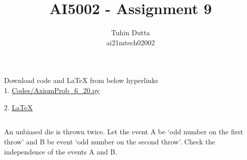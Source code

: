 \documentclass[journal,12pt,twocolumn]{IEEEtran}
\begin{document}
\providecommand{\mtx}[1]{\mathbf{#1}}
\providecommand{\fourier}{\overset{\mathcal{F}}{ \rightleftharpoons}}
\providecommand{\system}{\overset{\mathcal{H}}{ \longleftrightarrow}}
\newcommand{\solution}{\noindent \textbf{Solution: }}
\newcommand{\cosec}{\,\text{cosec}\,}
\providecommand{\dec}[2]{\ensuremath{\overset{#1}{\underset{#2}{\gtrless}}}}
\newcommand{\myvec}[1]{\ensuremath{\begin{pmatrix}#1\end{pmatrix}}}
\newcommand{\mydet}[1]{\ensuremath{\begin{vmatrix}#1\end{vmatrix}}}
\makeatletter
{}
\makeatother
\let\StandardTheFigure\thefigure
\let\vec\mathbf
\renewcommand{\thefigure}{\theproblem}
\def\putbox#1#2#3{\makebox[0in][l]{\makebox[#1][l]{}\raisebox{\baselineskip}[0in][0in]{\raisebox{#2}[0in][0in]{#3}}}}
     \def\rightbox#1{\makebox[0in][r]{#1}}
     \def\centbox#1{\makebox[0in]{#1}}
     \def\topbox#1{\raisebox{-\baselineskip}[0in][0in]{#1}}
     \def\midbox#1{\raisebox{-0.5\baselineskip}[0in][0in]{#1}}
\vspace{3cm}
\title{AI5002 - Assignment 9}
\author{Tuhin Dutta\\ ai21mtech02002}
\maketitle
\newpage
\bigskip
\renewcommand{\thefigure}{\theenumi}
\renewcommand{\thetable}{\theenumi}
\begin{mdframed}
Download code and LaTeX from below hyperlinks\\
1. \href{https://github.com/Tauhait/AI5002/blob/main/Assignment-9/Codes/AxiomProb\_6\_20.py}{Codes/AxiomProb\_6\_20.py}


2. \href{https://github.com/Tauhait/AI5002/tree/main/Assignment-9/LaTeX}{LaTeX}
\end{mdframed}
\subsection*{}
\begin{flushleft} An unbiased die is thrown twice. Let the event
A be `odd number on the first throw' and B
be event `odd number on the second throw'.
Check the independence of the events A and
B. \end{flushleft}
\end{document}
